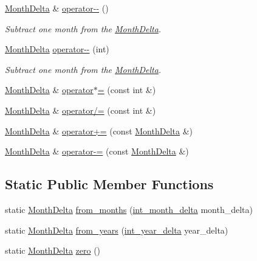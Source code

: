 \begin{DoxyCompactItemize}
\hyperlink{structMonthDelta}{\-Month\-Delta} \& \hyperlink{structMonthDelta_a792c4dd313efad2aec9dc80b7d18dc4e}{operator-\/-\/} ()
\begin{DoxyCompactList}\small\item\em \-Subtract one month from the \hyperlink{structMonthDelta}{\-Month\-Delta}. \end{DoxyCompactList}\item 
\hyperlink{structMonthDelta}{\-Month\-Delta} \hyperlink{structMonthDelta_a57b2bfc986e466491dc6ae5546988de7}{operator-\/-\/} (int)
\begin{DoxyCompactList}\small\item\em \-Subtract one month from the \hyperlink{structMonthDelta}{\-Month\-Delta}. \end{DoxyCompactList}\item 
\hyperlink{structMonthDelta}{\-Month\-Delta} \& \hyperlink{structMonthDelta_ad80b56e9007353c7e71f262fad0146a6}{operator$\ast$=} (const int \&)
\item 
\hyperlink{structMonthDelta}{\-Month\-Delta} \& \hyperlink{structMonthDelta_ae1aafe21948a9865384e4d1ef1786b27}{operator/=} (const int \&)
\item 
\hyperlink{structMonthDelta}{\-Month\-Delta} \& \hyperlink{structMonthDelta_a9b3e2752469f43e31bf71390149717ef}{operator+=} (const \hyperlink{structMonthDelta}{\-Month\-Delta} \&)
\item 
\hyperlink{structMonthDelta}{\-Month\-Delta} \& \hyperlink{structMonthDelta_aead99fd037d1a43ab477733c105d1d6e}{operator-\/=} (const \hyperlink{structMonthDelta}{\-Month\-Delta} \&)
\end{DoxyCompactItemize}
\subsection*{\-Static \-Public \-Member \-Functions}
\begin{DoxyCompactItemize}
\item 
static \hyperlink{structMonthDelta}{\-Month\-Delta} \hyperlink{structMonthDelta_afc96dd6ca914abc1ddd067f8f3755a89}{from\-\_\-months} (\hyperlink{types_8h_afc803698820c39aa1ed3694de502a591}{int\-\_\-month\-\_\-delta} month\-\_\-delta)
\item 
static \hyperlink{structMonthDelta}{\-Month\-Delta} \hyperlink{structMonthDelta_a02632b6ef33850d9329bd04a686ce1ed}{from\-\_\-years} (\hyperlink{types_8h_a6a5c8fde0b5ed80727db4db4bdd2173d}{int\-\_\-year\-\_\-delta} year\-\_\-delta)
\item 
static \hyperlink{structMonthDelta}{\-Month\-Delta} \hyperlink{structMonthDelta_a847cb9c956c133957dbaffb32fb9bd15}{zero} ()
\end{DoxyCompactItemize}
